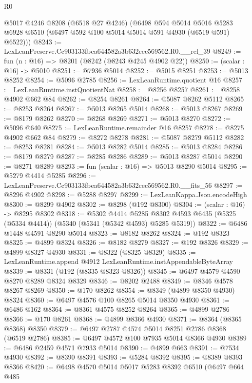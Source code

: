 \begin{lexlean}{R0}
\begin{coremodule}
      @5017
      @4246
      @8208
      (@6518 @27 @4246)
      (@6498
        @594
        @5014
        @5016
        @5283
        @6928
        @6510
        (@6497 @592 @100 @5014 @5014 @591 @4930 (@6519 @591) @6522)))
@8243 := LexLeanPreserve.Cc903133fbea644582a3b632cec569562.R0.__rel_39
@8249 := fun (n : @16) => @8201 (@8242 (@8243 @4245 @4902 @22))
@8250 := (scalar : @16) -> @5010
@8251 := @7936 @5014
@8252 := @5015 @8251
@8253 := @5013 @8252
@8254 := @5096 @2785
@8256 := LexLeanRuntime.quotient @16
@8257 := LexLeanRuntime.instQuotientNat
@8258 := @8256 @8257
@8261 := @8258 @4902 @662 @84
@8262 := @8254 @8261
@8264 := @5087 @8262 @5112
@8265 := @8253 @8264
@8267 := @5013 @8265 @5014
@8268 := @5013 @8267
@8269 := @8179 @8262
@8270 := @8268 @8269
@8271 := @5013 @8270
@8272 := @5096 @640
@8275 := LexLeanRuntime.remainder @16 @8257
@8278 := @8275 @4902 @662 @84
@8279 := @8272 @8278
@8281 := @5087 @8279 @5112
@8282 := @8253 @8281
@8284 := @5013 @8282 @5014
@8285 := @5013 @8284
@8286 := @8179 @8279
@8287 := @8285 @8286
@8289 := @5013 @8287 @5014
@8290 := @8271 @8289
@8293 := fun (scalar : @16) => @5013 @8290 @5014
@8295 := @5279 @4414 @5285
@8296 := LexLeanPreserve.Cc903133fbea644582a3b632cec569562.R0.__fits_56
@8297 := @8296 @4902
@8298 := @5288 @8297
@8299 := LexLeanKappa.Json.encodeHigh
@8300 := @8299 @4902
@8302 := @8298 (@192 @8300)
@8304 := (scalar : @16) -> @8295 @8302
@8318 := @5302
    @4414
    @5285
    @8302
    @4593
    @6435
    (@5325 (@5334 @4414))
    (@5340 (@5341 (@5342 @4593) @5285 @5319))
@8322 := @6486 @1448 @4591 @8290 @5014
@8323 := @8182 @8262
@8324 := @192 @8323
@8325 := @4899 @8324
@8326 := @8182 @8279
@8327 := @192 @8326
@8329 := @4899 @8327 @4930
@8331 := @8322 (@8325 @8329)
@8335 := LexLeanRuntime.append @4912 LexLeanRuntime.instAppendableByteArray
@8339 := @8331 (@192 (@8335 @8323 @8326))
@8345 := @6497 @4579 @4590 @8270 @8289 @8324 @8329
@8346 := @8202 @2488
@8349 := @8346 @4578 @8267 @8269
@8350 := @170 @8262
@8354 := @8349 (@4899 @8350 @4930) @8324
@8360 := @6497 @4576 @100 @8265 @5014 @8350 @4930
@8361 := @6486 @162
@8364 := @8361 @4575 @8252 @8264
@8365 := @4899 @2786
@8366 := @170 @8261
@8368 := @4899 @8366 @4930
@8371 := @8364 (@8365 @8368) @8350
@8379 := @6497 @2787 @4574 @5014 @8251 @2786 @8368 (@6519 @2786)
@8385 := @6497 @4572 @100 @7935 @5014 @8366 @4930
@8389 := @6486 @2459 @4571 @7933 @5014
@8390 := @4899 @663
@8391 := @7534 @4930
@8392 := @8390 @8391
@8393 := @5284 @8392
@8395 := @8389 @8393 @8366
@8420 := @6498
    @4570
    @5014
    @5017
    @5283
    @8392
    @6510
    (@6497
      @664
      @485

\end{coremodule}
\end{lexlean}
